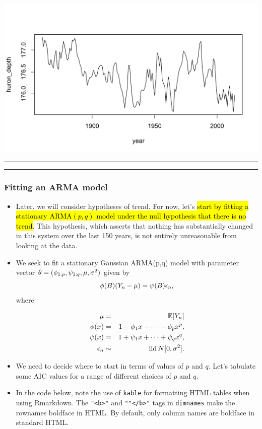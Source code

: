 \documentclass[]{article}
\begin{document}
\begin{center}\includegraphics{figure/intro-select_annual-1} \end{center}

\begin{center}\rule{0.5\linewidth}{\linethickness}\end{center}

\begin{center}\rule{0.5\linewidth}{\linethickness}\end{center}

\subsubsection{Fitting an ARMA model}\label{fitting-an-arma-model}

\begin{itemize}
\item
  Later, we will consider hypotheses of trend. For now, let's \hl{start by
  fitting a stationary ARMA$(p,q)$ model under the null hypothesis
  that there is no trend}. This hypothesis, which asserts that nothing
  has substantially changed in this system over the last 150 years, is
  not entirely unreasonable from looking at the data.
\item
  We seek to fit a stationary Gaussian ARMA(p,q) model with parameter
  vector \(\theta=(\phi_{1:p},\psi_{1:q},\mu,\sigma^2)\) given by
  \[ \phi(B)(Y_n-\mu) = \psi(B) \epsilon_n,\] where

  \begin{eqnarray}
  \mu &=& \mathbb{E}[Y_n]
  \\
  \phi(x)&=&1-\phi_1 x-\dots -\phi_px^p,
  \\ 
  \psi(x)&=&1+\psi_1 x+\dots +\psi_qx^q, 
  \\
  \epsilon_n&\sim&\mathrm{ iid }\, N[0,\sigma^2].
  \end{eqnarray}
\item
  We need to decide where to start in terms of values of \(p\) and
  \(q\). Let's tabulate some AIC values for a range of different choices
  of \(p\) and \(q\).
\item
  In the code below, note the use of \texttt{kable} for formatting HTML
  tables when using Rmarkdown. The \texttt{"\textless{}b\textgreater{}"}
  and \texttt{""\textless{}/b\textgreater{}"} tags in \texttt{dimnames}
  make the rownames boldface in HTML. By default, only column names are
  boldface in standard HTML.
\end{itemize}
\end{document}
